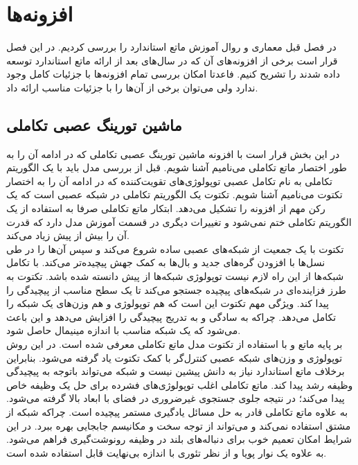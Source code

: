 \chapter{افزونه‌ها}
در فصل قبل معماری و روال آموزش ماتع استاندارد را بررسی کردیم. در این فصل قرار است برخی از افزونه‌های آن که در سال‌های بعد از ارائه ماتع استاندارد توسعه داده شدند را تشریح کنیم. فاعدتا امکان بررسی تمام افزونه‌ها با جزئیات کامل وجود ندارد ولی می‌توان برخی از آن‌ها را با جزئیات مناسب ارائه داد.

\section{ماشین تورینگ عصبی تکاملی}
در این بخش قرار است با افزونه ماشین تورینگ عصبی تکاملی که در ادامه آن را به طور اختصار ماتع تکاملی می‌نامیم آشنا شویم. قبل از بررسی مدل باید با یک الگوریتم تکاملی به نام تکامل عصبی توپولوژی‌های تقویت‌کننده که در ادامه آن را به اختصار تکتوت می‌نامیم آشنا شویم. تکتوت یک الگوریتم تکاملی در شبکه عصبی است که یک رکن مهم از افزونه را تشکیل می‌دهد. ابتکار ماتع تکاملی صرفا به استفاده از یک الگوریتم تکاملی ختم نمی‌شود و تغییرات دیگری در قسمت آموزش مدل دارد که قدرت آن را بیش از پیش زیاد می‌کند. 
\\

 تکتوت با یک جمعیت از شبکه‌های عصبی ساده شروع می‌کند و سپس آن‌ها را در طی نسل‌ها با افزودن گره‌های جدید و بال‌ها به کمک جهش پیچیده‌تر می‌کند. با تکامل شبکه‌ها از این راه لازم نیست توپولوژی شبکه‌ها از پیش دانسته شده باشد. تکتوت به طرز فزاینده‌ای در شبکه‌های پیچیده جستجو می‌کند تا یک سطح مناسب از پیچیدگی را پیدا کند. ویژگی مهم تکتوت این است که هم توپولوژی و هم وزن‌های یک شبکه را تکامل می‌دهد. چراکه به سادگی و به تدریج پیچیدگی را افزایش می‌دهد و این باعث می‌شود که یک شبکه مناسب با اندازه مینیمال حاصل شود.\cite{merrild2018hyperntm}
\\

بر پایه ماتع و با استفاده از تکتوت مدل ماتع تکاملی معرفی شده است. در این روش توپولوژی و وزن‌های شبکه عصبی کنترل‌گر با کمک تکتوت یاد گرفته می‌شود. بنابراین برخلاف ماتع استاندارد نیاز به دانش پیشین نیست و شبکه می‌تواند باتوجه به پیچیدگی وظیفه رشد پیدا کند. ماتع تکاملی اغلب توپولوژی‌‌های فشرده برای حل یک وظیفه خاص پیدا می‌کند؛ در نتیجه جلوی جستجوی غیرضروری در فضای با ابعاد بالا گرفته می‌شود. به علاوه ماتع تکاملی قادر به حل مسائل یادگیری مستمر پیچیده است. چراکه شبکه از مشتق استفاده نمی‌کند و می‌تواند از توجه سخت و مکانیسم جابجایی بهره ببرد. در این شرایط امکان تعمیم خوب برای دنباله‌های بلند در وظیفه رونوشت‌گیری فراهم می‌شود. به علاوه یک نوار پویا و از نظر تئوری با اندازه بی‌نهایت قابل استفاده شده است.\cite{merrild2018hyperntm}
\\

